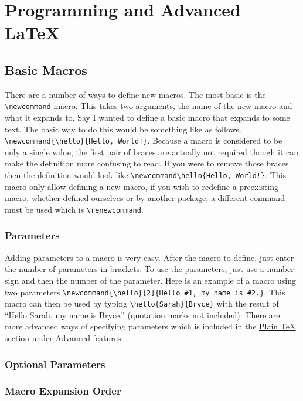 \section{Programming and Advanced LaTeX}

\subsection{Basic Macros}
There are a number of ways to define new macros. The most basic is the \verb=\newcommand= macro. This takes two arguments, the name of the new macro and what it expands to. Say I wanted to define a basic macro that expands to some text. The basic way to do this would be something like as follows. \verb=\newcommand{\hello}{Hello, World!}=. Because a macro is considered to be only a single value, the first pair of braces are actually not required though it can make the definition more confusing to read. If you were to remove those braces then the definition would look like \verb=\newcommand\hello{Hello, World!}=. This macro only allow defining a new macro, if you wish to redefine a preexisting macro, whether defined ourselves or by another package, a different command must be used which is \verb=\renewcommand=.
\subsubsection{Parameters}
Adding parameters to a macro is very easy. After the macro to define, just enter the number of parameters in brackets. To use the parameters, just use a number sign and then the number of the parameter. Here is an example of a macro using two parameters \verb=\newcommand{\hello}[2]{Hello #1, my name is #2.}=. This macro can then be used by typing \verb=\hello{Sarah}{Bryce}= with the result of \newcommand{\hello}[2]{Hello #1, my name is #2.}``\hello{Sarah}{Bryce}'' (quotation marks not included). There are more advanced ways of specifying parameters which is included in the \hyperref[section:programming/advancedFeatures/plainTeX]{Plain \TeX{}} section under \hyperref[section:programming/advancedFeatures]{Advanced features}.
\subsubsection{Optional Parameters}
\subsubsection{Macro Expansion Order}
